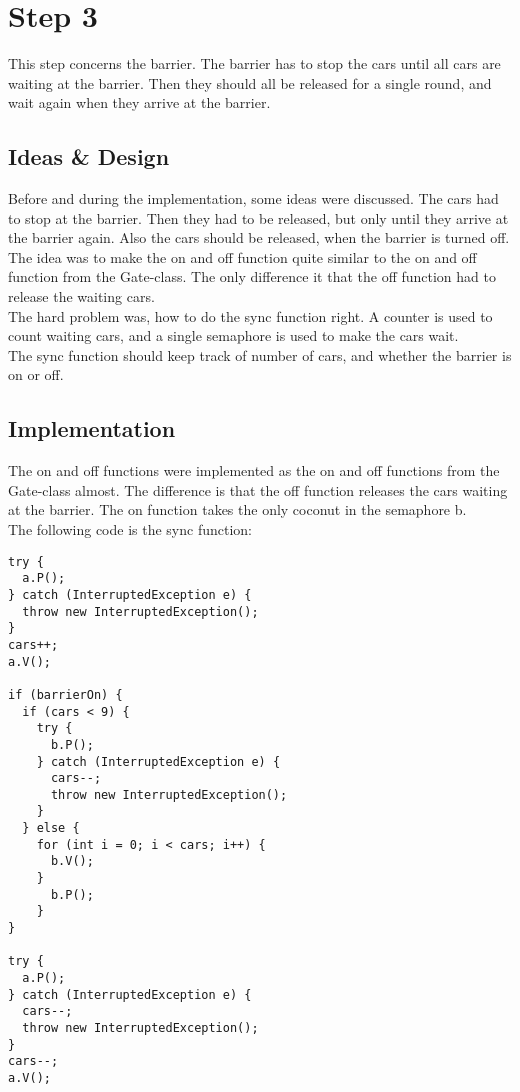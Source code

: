 \section{Step 3}
This step concerns the barrier. The barrier has to stop the cars until all cars are waiting at the barrier. Then they should all be released for a single round, and wait again when they arrive at the barrier.

\subsection{Ideas \& Design}
Before and during the implementation, some ideas were discussed. The cars had to stop at the barrier. Then they had to be released, but only until they arrive at the barrier again. Also the cars should be released, when the barrier is turned off. \\
The idea was to make the on and off function quite similar to the on and off function from the Gate-class. The only difference it that the off function had to release the waiting cars.\\ 
The hard problem was, how to do the sync function right. A counter is used to count waiting cars, and a single semaphore is used to make the cars wait. \\
The sync function should keep track of number of cars, and whether the barrier is on or off.

\subsection{Implementation}
The on and off functions were implemented as the on and off functions from the Gate-class almost. The difference is that the off function releases the cars waiting at the barrier. The on function takes the only coconut in the semaphore b.\\

The following code is the sync function:
\begin{lstlisting}
try {
  a.P();
} catch (InterruptedException e) {
  throw new InterruptedException();
}
cars++;
a.V();

if (barrierOn) {
  if (cars < 9) {
    try {
      b.P();
    } catch (InterruptedException e) {
      cars--;
      throw new InterruptedException();
    }
  } else {
    for (int i = 0; i < cars; i++) {
      b.V();
    }
      b.P();
    }
}

try {
  a.P();
} catch (InterruptedException e) {
  cars--;
  throw new InterruptedException();
}
cars--;
a.V();
\end{lstlisting}
\vspace{.8cm}

